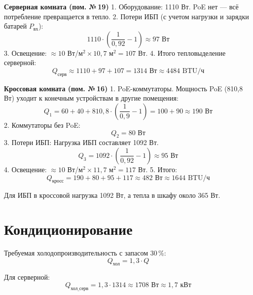 \documentclass{bmstu}
\begin{document}
\textbf{Серверная комната (пом. №\,19)}
1. Оборудование: 1110 Вт. PoE нет — всё потребление превращается в тепло.
2. Потери ИБП (с учетом нагрузки и зарядки батарей $P_{\text{вх}}$):
\begin{equation}
    1110 \cdot \left(\frac{1}{0{,}92} - 1\right) \approx 97 \text{ Вт}
\end{equation}
3. Освещение: $\approx 10$ Вт/м$^2 \times 10,7$ м$^2 = 107$ Вт. 
4. Итого тепловыделение серверной:
\begin{equation}
    Q_{\text{серв}} \approx 1110 + 97 + 107 = 1314 \text{ Вт} \approx 4484 \text{ BTU/ч}
\end{equation}

\textbf{Кроссовая комната (пом. №\,16)}
1. PoE-коммутаторы. Мощность PoE (810,8 Вт) уходит к конечным устройствам в другие помещения:
\begin{equation}
    Q_1 = 60 + 40 + 810{,}8 \cdot \left(\frac{1}{0{,}9} - 1\right) = 100 + 90 \approx 190 \text{ Вт}
\end{equation}
2. Коммутаторы без PoE:
\begin{equation}
    Q_2 = 80 \text{ Вт}
\end{equation}
3. Потери ИБП: Нагрузка ИБП составляет 1092 Вт.
\begin{equation}
    Q_3 = 1092 \cdot \left(\frac{1}{0{,}92} - 1\right) \approx 95 \text{ Вт}
\end{equation}
4. Освещение: $\approx 10$ Вт/м$^2 \times 11,7$ м$^2 = 117$ Вт.
5. Итого:
\begin{equation}
    Q_{\text{кросс}} = 190 + 80 + 95 + 117 \approx 482 \text{ Вт} \approx 1644 \text{ BTU/ч}
\end{equation}

Для ИБП в кроссовой нагрузка 1092 Вт, а тепла в шкафу около 365 Вт.

\section{Кондиционирование}

Требуемая холодопроизводительность с запасом 30\,\%:
\begin{equation}
    Q_{\text{хол}} = 1{,}3 \cdot Q
\end{equation}

Для серверной:
\begin{equation}
    Q_{\text{хол\_серв}} = 1{,}3 \cdot 1314 \approx 1708 \text{ Вт} \approx 1{,}7 \text{ кВт}
\end{equation}
\end{document}
